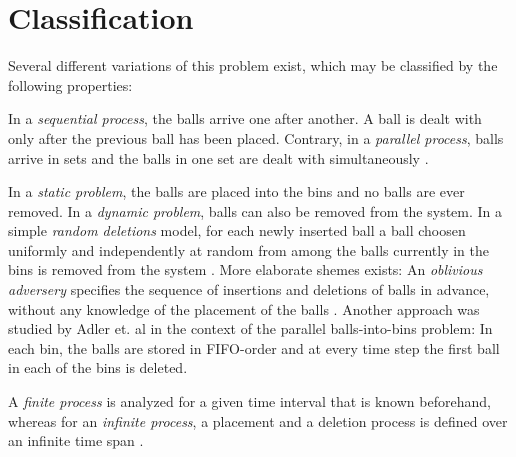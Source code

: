 \documentclass[a4paper,12pt]{article}
\begin{document}
\begin{comment}
In Section \ref{sec:strategies}, we will provide asymptotic bounds for the addative gap of this strategy, which we will then use to devise more complex strategies that significantly reduce these bounds. 
\end{comment}

\begin{comment}
These result may sometimes seem surprising, which is why we will denote a significant part of this article to demonstrate proofs in detail. This proof technique may be useful for devising asymptotic bounds for the additive gap of different balls-into-bins scenarios and strategies.
\end{comment}


\section{Classification}
\label{sec:classification}
Several different variations of this problem exist, which may be classified by the following properties:
\begin{compactitem}
\item In a \emph{sequential process}, the balls arrive one after another. A  ball is dealt with only after the previous ball has been placed. Contrary, in a \emph{parallel process}, balls arrive in sets and the balls in one set are dealt with simultaneously \cite{ABS98}. 
\item In a \emph{static problem}, the balls are placed into the bins and no balls are ever removed. In a \emph{dynamic problem}, balls can also be removed from the system. In a simple \emph{random deletions} model, for each newly inserted ball a ball choosen uniformly and independently at random from among the balls currently in the bins is removed from the system \cite{ABKU99} \cite{MRS01}. More elaborate shemes exists: An \emph{oblivious adversery} specifies the sequence of insertions and deletions of balls in advance, without any knowledge of the placement of the balls \cite{CFM+98}. Another approach was studied by Adler et. al \cite{ABS98} in the context of the parallel balls-into-bins problem: In each bin, the balls are stored in FIFO-order and at every time step the first ball in each of the bins is deleted. 
\item A \emph{finite process} is analyzed for a given time interval that is known beforehand, whereas for an \emph{infinite process}, a placement and a deletion process is defined over an infinite time span \cite{ABS98}.
\end{compactitem}
\end{document}
